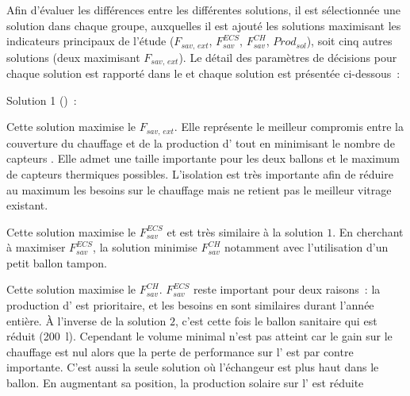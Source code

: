 Afin d’évaluer les différences entre les différentes solutions, il est sélectionnée
une solution dans chaque groupe, auxquelles il est ajouté les solutions maximisant les indicateurs
principaux de l’étude ($F_{sav,\,ext}$, $F_{sav}^{ECS}$, $F_{sav}^{CH}$, $Prod_{sol}$),
soit cinq autres solutions (deux maximisant $F_{sav,\,ext}$).
Le détail des paramètres de décisions pour chaque solution est rapporté dans le 
et chaque solution est présentée ci-dessous~:
\begin{blockdescription}{Solution 1 ()~:}
  \item[Solution 1 (\abr{S1})~:] Cette solution maximise le $F_{sav,\,ext}$. Elle représente
                                 le meilleur compromis entre la couverture du chauffage
                                 et de la production d’ tout en minimisant
                                 le nombre de capteurs . Elle admet une taille
                                 importante pour les deux ballons et le maximum de capteurs
                                 thermiques possibles. L’isolation est très importante
                                 afin de réduire au maximum les besoins sur le chauffage mais
                                 ne retient pas le meilleur vitrage existant.
  \item[Solution 2 (\abr{S2})~:] Cette solution maximise le $F_{sav}^{ECS}$ et est très
                                 similaire à la solution $1$. En cherchant à maximiser $F_{sav}^{ECS}$,
                                 la solution minimise $F_{sav}^{CH}$ notamment avec l’utilisation
                                 d’un petit ballon tampon.
  \item[Solution 3 (\abr{S3})~:] Cette solution maximise le $F_{sav}^{CH}$. $F_{sav}^{ECS}$ reste
                                 important pour deux raisons~: la production d’ est prioritaire,
                                 et les besoins en  sont similaires durant l’année entière.
                                 À l’inverse de la solution $2$, c’est cette fois le ballon sanitaire qui
                                 est réduit (\SI{200}{\litre}). Cependant le volume minimal n’est pas
                                 atteint car le gain sur le chauffage est nul alors que la perte de
                                 performance sur l’ est par contre importante. C’est aussi la seule solution où
                                 l’échangeur est plus haut dans le ballon.
                                 En augmentant sa position, la production solaire sur l’ est réduite

\end{blockdescription}
